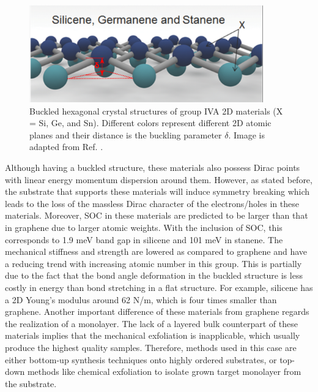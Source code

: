 \begin{figure}[htbp!] 
\centering  
\includegraphics[width=0.9\textwidth]{silicene_structure.png}
\caption[Group IVA 2D materials]{Buckled hexagonal crystal structures of group IVA 2D materials (X = Si, Ge, and Sn). Different colors represent different 2D atomic planes and their distance is the buckling parameter $\delta$. Image is adapted from Ref. \cite{Balendhran2015}.}  
\label{fig:silicene}
\end{figure} 


Although having a buckled structure, these materials also possess Dirac points with linear energy momentum dispersion around them\cite{Garcia2011}.  However, as stated before, the substrate that supports these materials will induce symmetry breaking which leads to the loss of the massless Dirac character of the electrons/holes\cite{Lin2013} in these materials. Moreover, SOC in these materials are predicted to be larger than that in graphene due to larger atomic weights. With the inclusion of SOC, this corresponds to 1.9 meV band gap in silicene and 101 meV in stanene\cite{matthes2013}. The mechanical stiffness and strength are lowered as compared to graphene and have a reducing trend with increasing atomic number in this group. This is partially due to the fact that the bond angle deformation in the buckled structure is less costly in energy than bond stretching in a flat structure\cite{Manjanath2014}. For example, silicene has a 2D Young's modulus around 62 \si{N/m}, which is four times smaller than graphene. Another important difference of these materials from graphene regards the realization of a monolayer. The lack of a layered bulk counterpart of these materials implies that the mechanical exfoliation is inapplicable, which usually produce the highest quality samples. Therefore, methods used in this case are either bottom-up synthesis techniques onto highly ordered substrates\cite{vogt2012,Linfei2014}, or top-down methods like chemical exfoliation to isolate grown target monolayer from the substrate\cite{lin2012,kaloni2013}.


